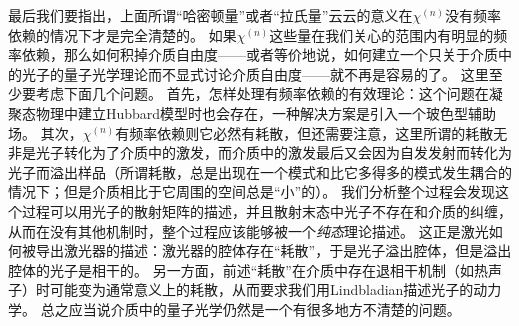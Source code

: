 最后我们要指出，上面所谓“哈密顿量”或者“拉氏量”云云的意义在$\chi^{(n)}$没有频率依赖的情况下才是完全清楚的。
如果$\chi^{(n)}$这些量在我们关心的范围内有明显的频率依赖，那么如何积掉介质自由度——或者等价地说，如何建立一个只关于介质中的光子的量子光学理论而不显式讨论介质自由度——就不再是容易的了。
这里至少要考虑下面几个问题。
首先，怎样处理有频率依赖的有效理论：这个问题在凝聚态物理中建立Hubbard模型时也会存在，一种解决方案是引入一个玻色型辅助场。
其次，$\chi^{(n)}$有频率依赖则它必然有耗散，但还需要注意，这里所谓的耗散无非是光子转化为了介质中的激发，而介质中的激发最后又会因为自发发射而转化为光子而溢出样品（所谓耗散，总是出现在一个模式和比它多得多的模式发生耦合的情况下；但是介质相比于它周围的空间总是“小”的）。
我们分析整个过程会发现这个过程可以用光子的散射矩阵的描述，并且散射末态中光子不存在和介质的纠缠，从而在没有其他机制时，整个过程应该能够被一个\emph{纯态}理论描述。
这正是激光如何被导出激光器的描述：激光器的腔体存在“耗散”，于是光子溢出腔体，但是溢出腔体的光子是相干的。
另一方面，前述“耗散”在介质中存在退相干机制（如热声子）时可能变为通常意义上的耗散，从而要求我们用Lindbladian描述光子的动力学。
总之应当说介质中的量子光学仍然是一个有很多地方不清楚的问题。